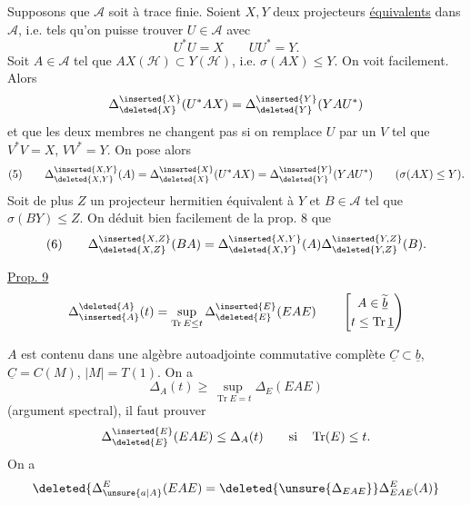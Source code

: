 Supposons  que $\mathcal A$ soit à trace finie. Soient $X,Y$ deux projecteurs  \uline{équivalents} dans $\mathcal A$, i.e. tels qu'on puisse trouver $U\in\mathcal A$ avec
\[
U^*U=X\qquad UU^*=Y.
\]
\margin{$*$}
Soit $A\in\mathcal A$ tel que $AX(\mathcal H)\subset Y(\mathcal H)$, i.e. $\sigma(AX)\leq Y$.  On voit facilement. Alors
\[
\Delta_{\deleted{X}}^{\inserted{X}}(U^*AX)=\Delta_{\deleted{Y}}^{\inserted{Y}}(YAU^*)
\]
et que les deux membres ne changent pas si on remplace $U$ par un $V$ tel que $V^*V=X$, $VV^*=Y$. On pose alors
\[
(5)\qquad
\Delta_{\deleted{X,Y}}^{\inserted{X,Y}}(A)
=\Delta_{\deleted{X}}^{\inserted{X}}(U^*AX)
=\Delta_{\deleted{Y}}^{\inserted{Y}}(YAU^*)
\qquad(\sigma(AX)\leq Y).
\]
Soit de plus $Z$ un projecteur hermitien équivalent à $Y$ et $B\in\mathcal A$ tel que $\sigma(BY)\leq Z$. On déduit bien facilement de la prop. 8 que
\margin{$=$}
\[
(6)\qquad
\Delta_{\deleted{X,Z}}^{\inserted{X,Z}}(BA)
=\Delta_{\deleted{X,Y}}^{\inserted{X,Y}}(A)
\Delta_{\deleted{Y,Z}}^{\inserted{Y,Z}}(B).
\]
\margin{$=$}

\uline{Prop. 9}\quad{}
\[
\Delta_{\inserted{A}}^{\deleted{A}}(t)
=\sup_{\operatorname{Tr}E\leq t}\Delta_{\deleted{E}}^{\inserted{E}}(EAE)
\qquad\left[\begin{gathered}A\in\widetilde{\underline b}\\t\leq\operatorname{Tr}\underline1\end{gathered}\right)
\]

$A$ est contenu dans une algèbre autoadjointe commutative complète $\underline C\subset\underline b$, $\underline C=C(M)$, $|M|=T(1)$. On a
\[
\Delta_A(t)\geq\sup_{\operatorname{Tr}E=t}\Delta_E(EAE)
\]
(argument spectral), il faut prouver
\[
\Delta_{\deleted{E}}^{\inserted{E}}(EAE)\leq\Delta_A(t)
\qquad\text{si}\quad \operatorname{Tr}(E)\leq t.
\]
On a
\[
\deleted{\Delta_{\unsure{a|A}}^E(EAE)=\deleted{\unsure{\Delta_{EAE}}}\Delta_{EAE}^E(A)}
\]
